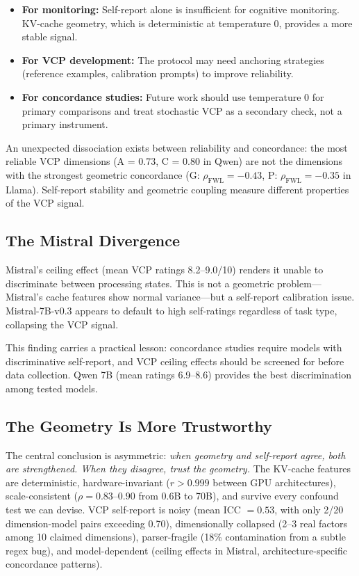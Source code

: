 \documentclass[11pt,a4paper]{article}
\begin{document}
\begin{itemize}
    \item \textbf{For monitoring:} Self-report alone is insufficient for cognitive monitoring. KV-cache geometry, which is deterministic at temperature 0, provides a more stable signal.
    \item \textbf{For VCP development:} The protocol may need anchoring strategies (reference examples, calibration prompts) to improve reliability.
    \item \textbf{For concordance studies:} Future work should use temperature 0 for primary comparisons and treat stochastic VCP as a secondary check, not a primary instrument.
\end{itemize}

An unexpected dissociation exists between reliability and concordance: the most reliable VCP dimensions (A = 0.73, C = 0.80 in Qwen) are not the dimensions with the strongest geometric concordance (G: $\rho_{\text{FWL}} = -0.43$, P: $\rho_{\text{FWL}} = -0.35$ in Llama). Self-report stability and geometric coupling measure different properties of the VCP signal.

\subsection{The Mistral Divergence}

Mistral's ceiling effect (mean VCP ratings 8.2--9.0/10) renders it unable to discriminate between processing states. This is not a geometric problem---Mistral's cache features show normal variance---but a self-report calibration issue. Mistral-7B-v0.3 appears to default to high self-ratings regardless of task type, collapsing the VCP signal.

This finding carries a practical lesson: concordance studies require models with discriminative self-report, and VCP ceiling effects should be screened for before data collection. Qwen 7B (mean ratings 6.9--8.6) provides the best discrimination among tested models.

\subsection{The Geometry Is More Trustworthy}

The central conclusion is asymmetric: \emph{when geometry and self-report agree, both are strengthened. When they disagree, trust the geometry.} The KV-cache features are deterministic, hardware-invariant ($r > 0.999$ between GPU architectures), scale-consistent ($\rho = 0.83$--$0.90$ from 0.6B to 70B), and survive every confound test we can devise. VCP self-report is noisy (mean ICC $= 0.53$, with only 2/20 dimension-model pairs exceeding 0.70), dimensionally collapsed (2--3 real factors among 10 claimed dimensions), parser-fragile (18\% contamination from a subtle regex bug), and model-dependent (ceiling effects in Mistral, architecture-specific concordance patterns).
\end{document}
